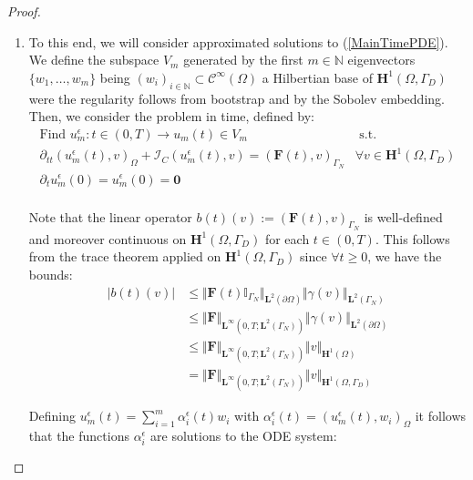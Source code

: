 \begin{proof}
\begin{enumerate}
    \item To this end, we will consider approximated solutions to (\ref{MainTimePDE}). We define the subspace $V_m$ generated by the first $m \in \mathbb{N}$ eigenvectors $\{w_1, \dots, w_m \}$ being $(w_i)_{i \in \mathbb{N}} \subset \mathcal{C}^{\infty}(\Omega)$ a Hilbertian base of $\mathbf{H}^1(\Omega, \Gamma_D)$ were the regularity follows from bootstrap and by the Sobolev embedding.
    Then, we consider the problem in time, defined by:
    \begin{equation}
        \label{ApproxTimePDE}
        \begin{array}{cc}
            \text{Find } u^{\epsilon}_m: t \in (0,T) \longrightarrow u_m(t) \in V_m & \text{ s.t. } \\
            \partial_{tt}(u_m^{\epsilon}(t),v)_{\Omega} + \mathcal{I}_{C}(u^{\epsilon}_m(t),v) = (\mathbf{F}(t),v)_{\Gamma_N} & \forall v \in \mathbf{H}^1(\Omega,\Gamma_D) \\
            \partial_{t} u^{\epsilon}_m(0) = u^{\epsilon}_m(0) = \mathbf{0} & \\
        \end{array}
    \end{equation}
    \begin{rem}
    Note that the linear operator $b(t)(v) := (\mathbf{F}(t),v)_{\Gamma_N}$ is well-defined and moreover continuous on $\mathbf{H}^1(\Omega,\Gamma_D)$ for each $t \in (0,T)$.
    This follows from the trace theorem applied on $\mathbf{H}^1(\Omega, \Gamma_D)$ since $\forall t \geq 0$, we have the bounds:
    \begin{align*}
        \vert b(t)(v) \vert & \leq \Vert \mathbf{F}(t) \mathbb{I}_{\Gamma_N} \Vert_{\mathbf{L}^2(\partial \Omega)} \Vert \gamma (v) \Vert_{\mathbf{L}^2(\Gamma_N)} \\
        & \leq \Vert \mathbf{F}\Vert_{\mathbf{L}^{\infty}(0,T;\mathbf{L}^2(\Gamma_N))} \Vert \gamma(v) \Vert_{\mathbf{L}^2(\partial \Omega)} \\
        & \leq \Vert \mathbf{F} \Vert_{\mathbf{L}^{\infty}(0,T;\mathbf{L}^2(\Gamma_N))} \Vert v \Vert_{\mathbf{H}^1(\Omega)}\\
        & = \Vert \mathbf{F}\Vert_{\mathbf{L}^{\infty}(0,T;\mathbf{L}^2(\Gamma_N))} \Vert v \Vert_{\mathbf{H}^1(\Omega, \Gamma_D)}
    \end{align*}
    \end{rem}
    Defining $u^{\epsilon}_m(t) = \sum_{i=1}^m \alpha_i^{\epsilon}(t) w_i$ with $\alpha_i^{\epsilon} (t) = (u^{\epsilon}_m(t),w_i)_{\Omega}$ it follows that the functions $\alpha_i^{\epsilon}$ are solutions to the ODE system:

\end{enumerate}
\end{proof}
